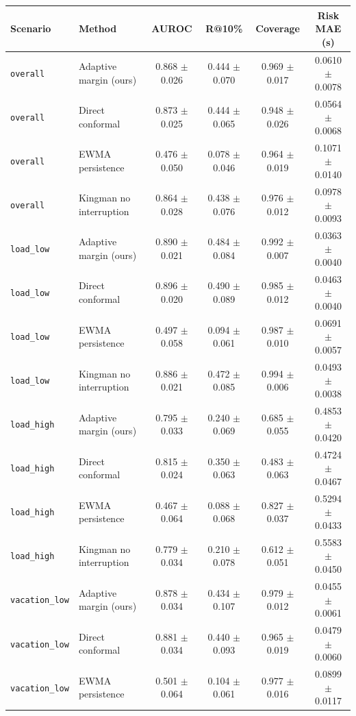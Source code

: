 \begin{tabular}{llcccc}
\hline
Scenario & Method & AUROC & R@10\% & Coverage & Risk MAE (s) \\
\hline
\texttt{overall} & Adaptive margin (ours) & 0.868 $\pm$ 0.026 & 0.444 $\pm$ 0.070 & 0.969 $\pm$ 0.017 & 0.0610 $\pm$ 0.0078 \\
\texttt{overall} & Direct conformal & 0.873 $\pm$ 0.025 & 0.444 $\pm$ 0.065 & 0.948 $\pm$ 0.026 & 0.0564 $\pm$ 0.0068 \\
\texttt{overall} & EWMA persistence & 0.476 $\pm$ 0.050 & 0.078 $\pm$ 0.046 & 0.964 $\pm$ 0.019 & 0.1071 $\pm$ 0.0140 \\
\texttt{overall} & Kingman no interruption & 0.864 $\pm$ 0.028 & 0.438 $\pm$ 0.076 & 0.976 $\pm$ 0.012 & 0.0978 $\pm$ 0.0093 \\
\hline
\texttt{load\_low} & Adaptive margin (ours) & 0.890 $\pm$ 0.021 & 0.484 $\pm$ 0.084 & 0.992 $\pm$ 0.007 & 0.0363 $\pm$ 0.0040 \\
\texttt{load\_low} & Direct conformal & 0.896 $\pm$ 0.020 & 0.490 $\pm$ 0.089 & 0.985 $\pm$ 0.012 & 0.0463 $\pm$ 0.0040 \\
\texttt{load\_low} & EWMA persistence & 0.497 $\pm$ 0.058 & 0.094 $\pm$ 0.061 & 0.987 $\pm$ 0.010 & 0.0691 $\pm$ 0.0057 \\
\texttt{load\_low} & Kingman no interruption & 0.886 $\pm$ 0.021 & 0.472 $\pm$ 0.085 & 0.994 $\pm$ 0.006 & 0.0493 $\pm$ 0.0038 \\
\hline
\texttt{load\_high} & Adaptive margin (ours) & 0.795 $\pm$ 0.033 & 0.240 $\pm$ 0.069 & 0.685 $\pm$ 0.055 & 0.4853 $\pm$ 0.0420 \\
\texttt{load\_high} & Direct conformal & 0.815 $\pm$ 0.024 & 0.350 $\pm$ 0.063 & 0.483 $\pm$ 0.063 & 0.4724 $\pm$ 0.0467 \\
\texttt{load\_high} & EWMA persistence & 0.467 $\pm$ 0.064 & 0.088 $\pm$ 0.068 & 0.827 $\pm$ 0.037 & 0.5294 $\pm$ 0.0433 \\
\texttt{load\_high} & Kingman no interruption & 0.779 $\pm$ 0.034 & 0.210 $\pm$ 0.078 & 0.612 $\pm$ 0.051 & 0.5583 $\pm$ 0.0450 \\
\hline
\texttt{vacation\_low} & Adaptive margin (ours) & 0.878 $\pm$ 0.034 & 0.434 $\pm$ 0.107 & 0.979 $\pm$ 0.012 & 0.0455 $\pm$ 0.0061 \\
\texttt{vacation\_low} & Direct conformal & 0.881 $\pm$ 0.034 & 0.440 $\pm$ 0.093 & 0.965 $\pm$ 0.019 & 0.0479 $\pm$ 0.0060 \\
\texttt{vacation\_low} & EWMA persistence & 0.501 $\pm$ 0.064 & 0.104 $\pm$ 0.061 & 0.977 $\pm$ 0.016 & 0.0899 $\pm$ 0.0117 \\

\end{tabular}
